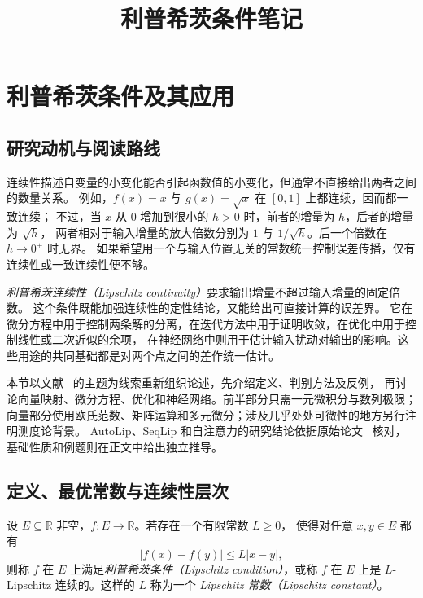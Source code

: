 \documentclass[UTF8,12pt,a4paper,fontset=fandol]{ctexart}
\title{利普希茨条件笔记}
\author{}
\date{}
\begin{document}
\maketitle
\tableofcontents

\section{利普希茨条件及其应用}
\label{sec:lipschitz}

\subsection{研究动机与阅读路线}
\label{subsec:lip-motivation}

连续性描述自变量的小变化能否引起函数值的小变化，但通常不直接给出两者之间的数量关系。
例如，$f(x)=x$ 与 $g(x)=\sqrt{x}$ 在 $[0,1]$ 上都连续，因而都一致连续；
不过，当 $x$ 从 $0$ 增加到很小的 $h>0$ 时，前者的增量为 $h$，后者的增量为 $\sqrt h$，
两者相对于输入增量的放大倍数分别为 $1$ 与 $1/\sqrt h$。后一个倍数在 $h\to0^+$ 时无界。
如果希望用一个与输入位置无关的常数统一控制误差传播，仅有连续性或一致连续性便不够。

\emph{利普希茨连续性（Lipschitz continuity）}要求输出增量不超过输入增量的固定倍数。
这个条件既能加强连续性的定性结论，又能给出可直接计算的误差界。
它在微分方程中用于控制两条解的分离，在迭代方法中用于证明收敛，在优化中用于控制线性或二次近似的余项，
在神经网络中则用于估计输入扰动对输出的影响。这些用途的共同基础都是对两个点之间的差作统一估计。

本节以文献~\cite{zhihu-intro,zhihu-deep} 的主题为线索重新组织论述，先介绍定义、判别方法及反例，
再讨论向量映射、微分方程、优化和神经网络。前半部分只需一元微积分与数列极限；
向量部分使用欧氏范数、矩阵运算和多元微分；涉及几乎处处可微性的地方另行注明测度论背景。
AutoLip、SeqLip 和自注意力的研究结论依据原始论文~\cite{scaman-virmaux,kim-attention} 核对，
基础性质和例题则在正文中给出独立推导。

\subsection{定义、最优常数与连续性层次}
\label{subsec:lip-definition}

\begin{definition}\label{def:lip-scalar}
设 $E\subseteq\mathbb R$ 非空，$f:E\to\mathbb R$。若存在一个有限常数 $L\ge0$，
使得对任意 $x,y\in E$ 都有
\begin{equation}\label{eq:lip-scalar}
  |f(x)-f(y)|\le L|x-y|,
\end{equation}
则称 $f$ 在 $E$ 上满足\emph{利普希茨条件（Lipschitz condition）}，或称 $f$ 在 $E$ 上是
$L$-Lipschitz 连续的。这样的 $L$ 称为一个 \emph{Lipschitz 常数（Lipschitz constant）}。
\end{definition}
\end{document}

